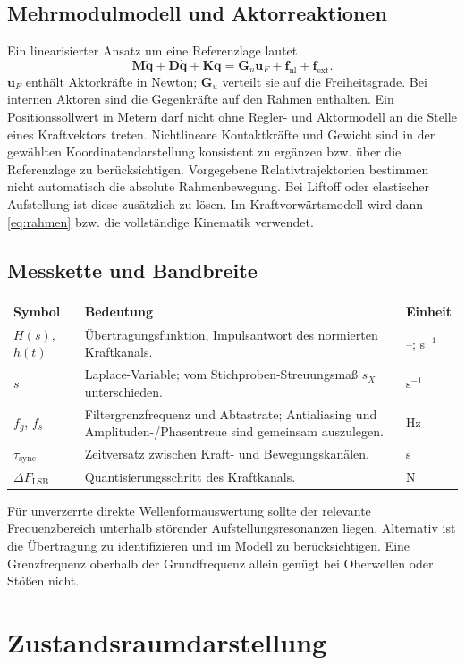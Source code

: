 \documentclass[11pt,a4paper]{article}
\makeatletter
\newenvironment{symtab}{\begin{longtable}{@{}L{.22\textwidth}L{.62\textwidth}L{.12\textwidth}@{}}\toprule\textbf{Symbol}&\textbf{Bedeutung}&\textbf{Einheit}\\\midrule\endhead}{\bottomrule\end{longtable}}
\makeatother
\begin{document}
\subsection{Mehrmodulmodell und Aktorreaktionen}
Ein linearisierter Ansatz um eine Referenzlage lautet
\begin{equation}
\mathbf M\ddot{\mathbf q}+\mathbf D\dot{\mathbf q}+\mathbf K\mathbf q
=\mathbf G_u\mathbf u_F+\mathbf f_{\mathrm{nl}}+\mathbf f_{\mathrm{ext}}.
\label{eq:dynamik}
\end{equation}
$\mathbf u_F$ enthält Aktorkräfte in Newton; $\mathbf G_u$ verteilt sie auf die Freiheitsgrade. Bei internen Aktoren sind die Gegenkräfte auf den Rahmen enthalten. Ein Positionssollwert in Metern darf nicht ohne Regler- und Aktormodell an die Stelle eines Kraftvektors treten. Nichtlineare Kontaktkräfte und Gewicht sind in der gewählten Koordinatendarstellung konsistent zu ergänzen bzw. über die Referenzlage zu berücksichtigen.
Vorgegebene Relativtrajektorien bestimmen nicht automatisch die absolute Rahmenbewegung. Bei Liftoff oder elastischer Aufstellung ist diese zusätzlich zu lösen. Im Kraftvorwärtsmodell wird dann \eqref{eq:rahmen} bzw. die vollständige Kinematik verwendet.

\subsection{Messkette und Bandbreite}
\begin{symtab}
$H(s)$, $h(t)$&Übertragungsfunktion, Impulsantwort des normierten Kraftkanals.&--; s$^{-1}$\\
$s$&Laplace-Variable; vom Stichproben-Streuungsmaß $s_X$ unterschieden.&s$^{-1}$\\
$f_g$, $f_s$&Filtergrenzfrequenz und Abtastrate; Antialiasing und Amplituden-/Phasentreue sind gemeinsam auszulegen.&Hz\\
$\tau_{\mathrm{sync}}$&Zeitversatz zwischen Kraft- und Bewegungskanälen.&s\\
$\Delta F_{\mathrm{LSB}}$&Quantisierungsschritt des Kraftkanals.&N\\
\end{symtab}
Für unverzerrte direkte Wellenformauswertung sollte der relevante Frequenzbereich unterhalb störender Aufstellungsresonanzen liegen. Alternativ ist die Übertragung zu identifizieren und im Modell zu berücksichtigen. Eine Grenzfrequenz oberhalb der Grundfrequenz allein genügt bei Oberwellen oder Stößen nicht.

\section{Zustandsraumdarstellung}\label{sec:zustandsraum}
\end{document}
